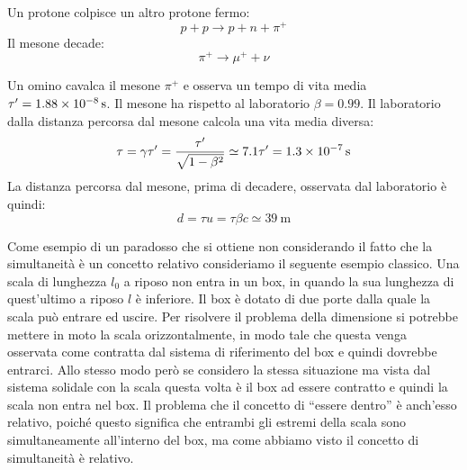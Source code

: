 \begin{Es}
   Un protone colpisce un altro protone fermo:
   \[p+p\rightarrow p+n+\pi^+\]
   Il mesone decade:
   \[\pi^+ \rightarrow \mu ^+ + \nu\]

   Un omino cavalca il mesone $\pi^+$ e osserva un tempo di vita media $\tau'=\SI{1.88E-8}{\second}$. Il mesone ha rispetto al laboratorio $\beta=0.99$. Il laboratorio dalla distanza percorsa dal mesone calcola una vita media diversa:
   \[\tau=\gamma\tau'=\frac{\tau'}{\sqrt{1-\beta^2}}\simeq 7.1\tau'=\SI{1.3E-7}{\second} \]
   La distanza percorsa dal mesone, prima di decadere, osservata dal laboratorio è quindi:
   \[d=\tau u=\tau \beta c\simeq \SI{39}{\metre} \]
\end{Es}

\begin{Es}
   Come esempio di un paradosso che si ottiene non considerando il fatto che la simultaneità è un concetto relativo consideriamo il seguente esempio classico. Una scala di lunghezza $l_0$ a riposo non entra in un box, in quando la sua lunghezza di quest'ultimo a riposo $l$ è inferiore. Il box è dotato di due porte dalla quale la scala può entrare ed uscire. Per risolvere il problema della dimensione si potrebbe mettere in moto la scala orizzontalmente, in modo tale che questa venga osservata come contratta dal sistema di riferimento del box e quindi dovrebbe entrarci. Allo stesso modo però se considero la stessa situazione ma vista dal sistema solidale con la scala questa volta è il box ad essere contratto e quindi la scala non entra nel box. Il problema che il concetto di ``essere dentro'' è anch'esso relativo, poiché questo significa che entrambi gli estremi della scala sono simultaneamente all'interno del box, ma come abbiamo visto il concetto di simultaneità è relativo.
\end{Es}

